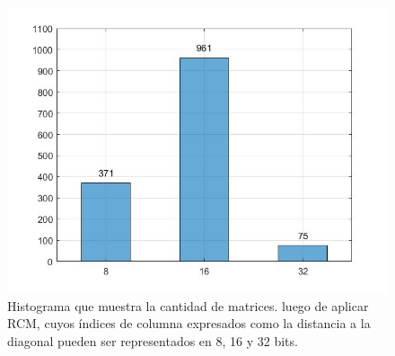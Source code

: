 
\begin{figure}[h]
  \centering
  \includegraphics[width=.6\textwidth]{imagenes/chap4/hist_diag_dist_cat_rcm.jpg}
  \caption{
  Histograma que muestra la cantidad de matrices. luego de aplicar RCM, cuyos índices de columna expresados como la distancia a la diagonal pueden ser representados en 8, 16 y 32 bits.
  }
  \label{fig:hist_diag_dist_cat_rcm}
\end{figure}%

